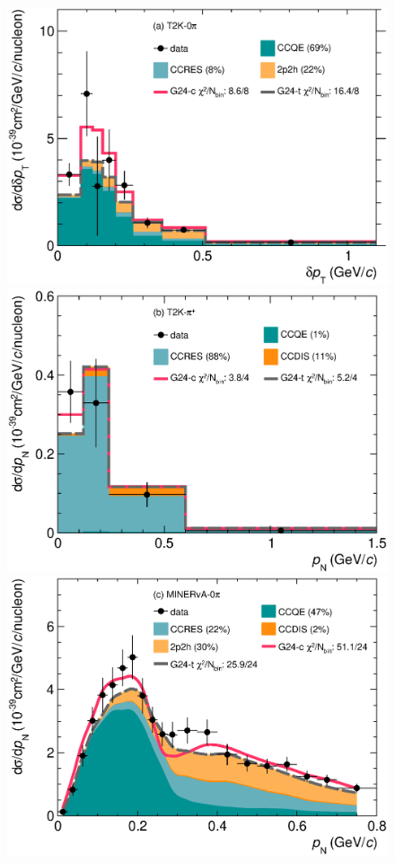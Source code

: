 \begin{figure}
        \includegraphics[width=\dbfigwid\textwidth]{figures/tuning/0013-t2k_0pi_dpt_reac_decomp.eps}
        \includegraphics[width=\dbfigwid\textwidth]{figures/tuning/0013-t2k_pip_pn_reac_decomp.eps}	
        \includegraphics[width=\dbfigwid\textwidth]{figures/tuning/0013-min_0pi_pn_reac_decomp.eps}

\end{figure}
